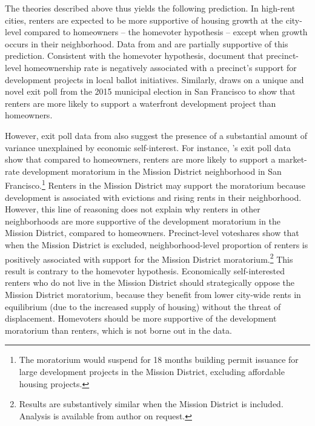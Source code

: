 \documentclass[article,11pt]{memoir}
\begin{document}
The theories described above thus yields the following prediction. In high-rent cities, renters are expected to be more supportive of housing growth at the city-level compared to homeowners -- the homevoter hypothesis -- except when growth occurs in their neighborhood. Data from \cite{gerber_development_2003} and \cite{hankinson_when_2018} are partially supportive of this prediction. Consistent with the homevoter hypothesis, \citeauthor{gerber_development_2003} document that precinct-level homeownership rate is negatively associated with a precinct's support for development projects in local ballot initiatives. Similarly, \citeauthor{hankinson_when_2018} draws on a unique and novel exit poll from the 2015 municipal election in San Francisco to show that renters are more likely to support a waterfront development project than homeowners. 

However, exit poll data from \cite{hankinson_when_2018} also suggest the presence of a substantial amount of variance unexplained by economic self-interest. For instance, \citeauthor{hankinson_when_2018}'s exit poll data show that compared to homeowners, renters are more likely to support a market-rate development moratorium in the Mission District neighborhood in San Francisco.\footnote{The moratorium would suspend for 18 months building permit issuance for large development projects in the Mission District, excluding affordable housing projects.} Renters in the Mission District may support the moratorium because development is associated with evictions and rising rents in their neighborhood. However, this line of reasoning does not explain why renters in other neighborhoods are more supportive of the development moratorium in the Mission District, compared to homeowners. Precinct-level voteshares show that when the Mission District is excluded, neighborhood-level proportion of renters is positively associated with support for the Mission District moratorium.\footnote{Results are substantively similar when the Mission District is included. Analysis is available from author on request.}  This result is contrary to the homevoter hypothesis. Economically self-interested renters who do not live in the Mission District should strategically oppose the Mission District moratorium, because they benefit from lower city-wide rents in equilibrium (due to the increased supply of housing) without the threat of displacement. Homevoters should be more supportive of the development moratorium than renters, which is not borne out in the data.
\end{document}
